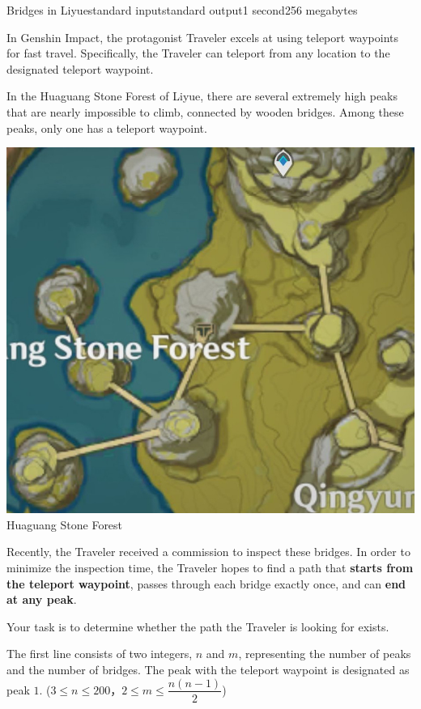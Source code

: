 \begin{problem}{Bridges in Liyue}{standard input}{standard output}{1 second}{256 megabytes}

In Genshin Impact, the protagonist Traveler excels at using teleport waypoints for fast travel. Specifically, the Traveler can teleport from any location to the designated teleport waypoint.

In the Huaguang Stone Forest of Liyue, there are several extremely high peaks that are nearly impossible to climb, connected by wooden bridges. Among these peaks, only one has a teleport waypoint.

\begin{center}
  \includegraphics[scale=0.8]{path.jpg} \\
  \small{Huaguang Stone Forest}
\end{center}

Recently, the Traveler received a commission to inspect these bridges. In order to minimize the inspection time, the Traveler hopes to find a path that \textbf{starts from the teleport waypoint}, passes through each bridge exactly once, and can \textbf{end at any peak}.

Your task is to determine whether the path the Traveler is looking for exists.

\InputFile
The first line consists of two integers, $n$ and $m$, representing the number of peaks and the number of bridges. The peak with the teleport waypoint is designated as peak $1$. ($3 \le n \le 200$，$2 \le m \le \dfrac{n(n - 1)}{2}$)


\end{problem}

